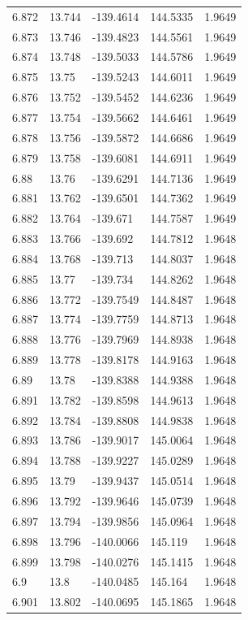 \begin{tabular}{lllll}
6.872 & 13.744 & -139.4614 & 144.5335 & 1.9649 \\
6.873 & 13.746 & -139.4823 & 144.5561 & 1.9649 \\
6.874 & 13.748 & -139.5033 & 144.5786 & 1.9649 \\
6.875 & 13.75 & -139.5243 & 144.6011 & 1.9649 \\
6.876 & 13.752 & -139.5452 & 144.6236 & 1.9649 \\
6.877 & 13.754 & -139.5662 & 144.6461 & 1.9649 \\
6.878 & 13.756 & -139.5872 & 144.6686 & 1.9649 \\
6.879 & 13.758 & -139.6081 & 144.6911 & 1.9649 \\
6.88 & 13.76 & -139.6291 & 144.7136 & 1.9649 \\
6.881 & 13.762 & -139.6501 & 144.7362 & 1.9649 \\
6.882 & 13.764 & -139.671 & 144.7587 & 1.9649 \\
6.883 & 13.766 & -139.692 & 144.7812 & 1.9648 \\
6.884 & 13.768 & -139.713 & 144.8037 & 1.9648 \\
6.885 & 13.77 & -139.734 & 144.8262 & 1.9648 \\
6.886 & 13.772 & -139.7549 & 144.8487 & 1.9648 \\
6.887 & 13.774 & -139.7759 & 144.8713 & 1.9648 \\
6.888 & 13.776 & -139.7969 & 144.8938 & 1.9648 \\
6.889 & 13.778 & -139.8178 & 144.9163 & 1.9648 \\
6.89 & 13.78 & -139.8388 & 144.9388 & 1.9648 \\
6.891 & 13.782 & -139.8598 & 144.9613 & 1.9648 \\
6.892 & 13.784 & -139.8808 & 144.9838 & 1.9648 \\
6.893 & 13.786 & -139.9017 & 145.0064 & 1.9648 \\
6.894 & 13.788 & -139.9227 & 145.0289 & 1.9648 \\
6.895 & 13.79 & -139.9437 & 145.0514 & 1.9648 \\
6.896 & 13.792 & -139.9646 & 145.0739 & 1.9648 \\
6.897 & 13.794 & -139.9856 & 145.0964 & 1.9648 \\
6.898 & 13.796 & -140.0066 & 145.119 & 1.9648 \\
6.899 & 13.798 & -140.0276 & 145.1415 & 1.9648 \\
6.9 & 13.8 & -140.0485 & 145.164 & 1.9648 \\
6.901 & 13.802 & -140.0695 & 145.1865 & 1.9648 \\

\end{tabular}
